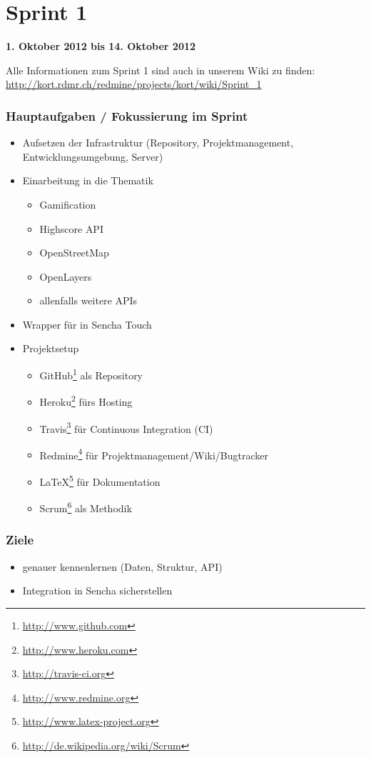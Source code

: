 \section{Sprint 1}

\textbf{1. Oktober 2012 bis 14. Oktober 2012}

Alle Informationen zum Sprint 1 sind auch in unserem Wiki zu finden:
\url{http://kort.rdmr.ch/redmine/projects/kort/wiki/Sprint_1}

\subsubsection{Hauptaufgaben / Fokussierung im Sprint}

\begin{itemize}
	\item Aufsetzen der Infrastruktur (Repository, Projektmanagement, Entwicklungsumgebung, Server)
	\item Einarbeitung in die Thematik
	\begin{itemize}
		\item \gls{Gamification}
		\item Highscore \gls{API}
		\item OpenStreetMap
		\item OpenLayers
		\item allenfalls weitere \glspl{API}
	\end{itemize}
	\item Wrapper für  in Sencha Touch
	\item Projektsetup
	\begin{itemize}
		\item GitHub\footnote{\url{http://www.github.com}} als Repository
		\item Heroku\footnote{\url{http://www.heroku.com}} fürs Hosting
		\item Travis\footnote{\url{http://travis-ci.org}} für Continuous Integration (CI)
		\item Redmine\footnote{\url{http://www.redmine.org}} für Projektmanagement/Wiki/Bugtracker
		\item \LaTeX{}\footnote{\url{http://www.latex-project.org}} für Dokumentation
		\item Scrum\footnote{\url{http://de.wikipedia.org/wiki/Scrum}} als Methodik
	\end{itemize}
\end{itemize}

\subsubsection{Ziele}
\begin{itemize}
	\item {} genauer kennenlernen (Daten, Struktur, \gls{API})
	\item Integration in Sencha sicherstellen
\end{itemize}

